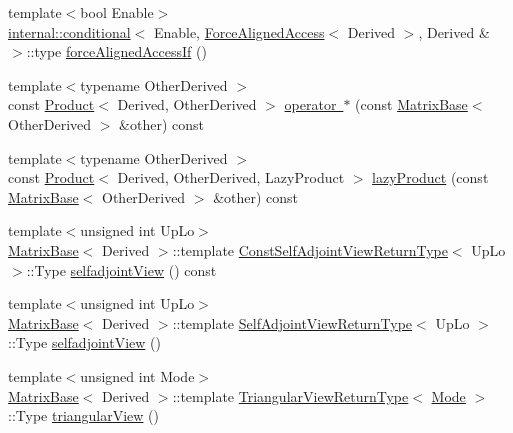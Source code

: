 \begin{DoxyCompactItemize}
\item 
{\footnotesize template$<$bool Enable$>$ }\\\mbox{\hyperlink{struct_eigen_1_1internal_1_1conditional}{internal\+::conditional}}$<$ Enable, \mbox{\hyperlink{class_eigen_1_1_force_aligned_access}{Force\+Aligned\+Access}}$<$ Derived $>$, Derived \& $>$\+::type \mbox{\hyperlink{class_eigen_1_1_matrix_base_ae35213d1dd4dd13ebe9a7a762d6bb847}{force\+Aligned\+Access\+If}} ()
\item 
{\footnotesize template$<$typename Other\+Derived $>$ }\\const \mbox{\hyperlink{class_eigen_1_1_product}{Product}}$<$ Derived, Other\+Derived $>$ \mbox{\hyperlink{class_eigen_1_1_matrix_base_a5ab97e79b3c117f7ca68d08a3dd430c3}{operator $\ast$}} (const \mbox{\hyperlink{class_eigen_1_1_matrix_base}{Matrix\+Base}}$<$ Other\+Derived $>$ \&other) const
\item 
{\footnotesize template$<$typename Other\+Derived $>$ }\\const \mbox{\hyperlink{class_eigen_1_1_product}{Product}}$<$ Derived, Other\+Derived, Lazy\+Product $>$ \mbox{\hyperlink{class_eigen_1_1_matrix_base_ae2618c462dfbfc952aeaf090bd3722cd}{lazy\+Product}} (const \mbox{\hyperlink{class_eigen_1_1_matrix_base}{Matrix\+Base}}$<$ Other\+Derived $>$ \&other) const
\item 
{\footnotesize template$<$unsigned int Up\+Lo$>$ }\\\mbox{\hyperlink{class_eigen_1_1_matrix_base}{Matrix\+Base}}$<$ Derived $>$\+::template \mbox{\hyperlink{struct_eigen_1_1_matrix_base_1_1_const_self_adjoint_view_return_type}{Const\+Self\+Adjoint\+View\+Return\+Type}}$<$ Up\+Lo $>$\+::Type \mbox{\hyperlink{class_eigen_1_1_matrix_base_a67eb836f331d9b567e7f36ec0782fa07}{selfadjoint\+View}} () const
\item 
{\footnotesize template$<$unsigned int Up\+Lo$>$ }\\\mbox{\hyperlink{class_eigen_1_1_matrix_base}{Matrix\+Base}}$<$ Derived $>$\+::template \mbox{\hyperlink{struct_eigen_1_1_matrix_base_1_1_self_adjoint_view_return_type}{Self\+Adjoint\+View\+Return\+Type}}$<$ Up\+Lo $>$\+::Type \mbox{\hyperlink{class_eigen_1_1_matrix_base_ad446541377593656c1399862fe6a0f94}{selfadjoint\+View}} ()
\item 
{\footnotesize template$<$unsigned int Mode$>$ }\\\mbox{\hyperlink{class_eigen_1_1_matrix_base}{Matrix\+Base}}$<$ Derived $>$\+::template \mbox{\hyperlink{struct_eigen_1_1_matrix_base_1_1_triangular_view_return_type}{Triangular\+View\+Return\+Type}}$<$ \mbox{\hyperlink{struct_mode}{Mode}} $>$\+::Type \mbox{\hyperlink{class_eigen_1_1_matrix_base_a56665aa894f49f2765291fee0eaeb9c6}{triangular\+View}} ()

\end{DoxyCompactItemize}
